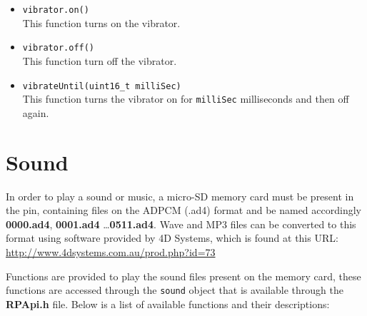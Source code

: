 \documentclass[a4paper, twoside, final]{book}%
\begin{document}
\begin{itemize}
  \item \texttt{vibrator.on()}\\
    This function turns on the vibrator.
  \item \texttt{vibrator.off()}\\
    This function turn off the vibrator.
  \item \texttt{vibrateUntil(uint16\_t milliSec)}\\
    This function turns the vibrator on for \texttt{milliSec} milliseconds and then off again.
\end{itemize}

\section{Sound}
In order to play a sound or music, a micro-SD memory card must be present in the pin, containing files on the ADPCM (.ad4) format and be named accordingly \textbf{0000.ad4}, \textbf{0001.ad4} \dots \textbf{0511.ad4}.
Wave and MP3 files can be converted to this format using software provided by 4D Systems, which is found at this URL:\\
\url{http://www.4dsystems.com.au/prod.php?id=73}

Functions are provided to play the sound files present on the memory card, these functions are accessed through the \texttt{sound} object that is available through the \textbf{RPApi.h} file.
Below is a list of available functions and their descriptions:
\end{document}
